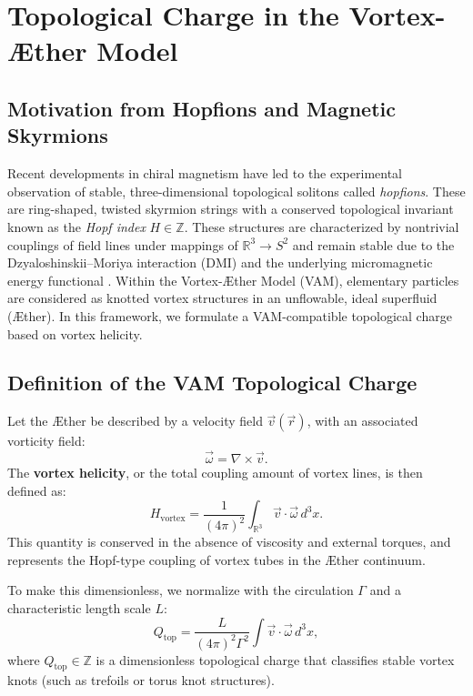 \section{Topological Charge in the Vortex-Æther Model}

\subsection{Motivation from Hopfions and Magnetic Skyrmions}

Recent developments in chiral magnetism have led to the experimental observation of stable, three-dimensional topological solitons called \emph{hopfions}. These are ring-shaped, twisted skyrmion strings with a conserved topological invariant known as the \emph{Hopf index} $H \in \mathbb{Z}$. These structures are characterized by nontrivial couplings of field lines under mappings of $\mathbb{R}^3 \to S^2$ and remain stable due to the Dzyaloshinskii–Moriya interaction (DMI) and the underlying micromagnetic energy functional \cite{Zheng2023Hopfions}. Within the Vortex-Æther Model (VAM), elementary particles are considered as knotted vortex structures in an unflowable, ideal superfluid (Æther). In this framework, we formulate a VAM-compatible topological charge based on vortex helicity.

\subsection{Definition of the VAM Topological Charge}

Let the Æther be described by a velocity field $\vec{v}(\vec{r})$, with an associated vorticity field:
\begin{equation}
    \vec{\omega} = \nabla \times \vec{v}.
\end{equation}
The \textbf{vortex helicity}, or the total coupling amount of vortex lines, is then defined as:
\begin{equation}
    H_{\text{vortex}} = \frac{1}{(4\pi)^2} \int_{\mathbb{R}^3} \vec{v} \cdot \vec{\omega} \, d^3x.
    \label{eq:helicity}
\end{equation}
This quantity is conserved in the absence of viscosity and external torques, and represents the Hopf-type coupling of vortex tubes in the Æther continuum.

To make this dimensionless, we normalize with the circulation $\Gamma$ and a characteristic length scale $L$:
\begin{equation}
    Q_{\text{top}} = \frac{L}{(4\pi)^2 \Gamma^2} \int \vec{v} \cdot \vec{\omega} \, d^3x,
    \label{eq:qtop}
\end{equation}
where $Q_{\text{top}} \in \mathbb{Z}$ is a dimensionless topological charge that classifies stable vortex knots (such as trefoils or torus knot structures).

